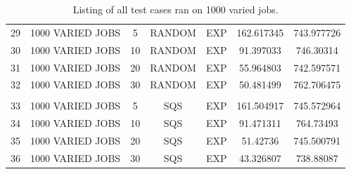 \documentclass{article}
\begin{document}
\begin{table}
\begin{tabular}{|c | c | c | c | c | c | c |}
   &                  &    &            &                   &            &            \\ \hline
29 & 1000 VARIED JOBS & 5  & RANDOM     & EXP               & 162.617345 & 743.977726 \\ \hline
30 & 1000 VARIED JOBS & 10 & RANDOM     & EXP               & 91.397033  & 746.30314  \\ \hline
31 & 1000 VARIED JOBS & 20 & RANDOM     & EXP               & 55.964803  & 742.597571 \\ \hline
32 & 1000 VARIED JOBS & 30 & RANDOM     & EXP               & 50.481499  & 762.706475 \\ \hline
   &                  &    &            &                   &            &            \\ \hline
33 & 1000 VARIED JOBS & 5  & SQS        & EXP               & 161.504917 & 745.572964 \\ \hline
34 & 1000 VARIED JOBS & 10 & SQS        & EXP               & 91.471311  & 764.73493  \\ \hline
35 & 1000 VARIED JOBS & 20 & SQS        & EXP               & 51.42736   & 745.500791 \\ \hline
36 & 1000 VARIED JOBS & 30 & SQS        & EXP               & 43.326807  & 738.88087  \\ \hline
\end{tabular}

\caption{Listing of all test cases ran on 1000 varied jobs. \label{variedJobsTable}}
\end{table}
\end{document}
